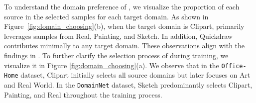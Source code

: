 To understand the domain preference of \ourmethod{}, we visualize the proportion of each source in the selected samples for each target domain. As shown in Figure~\ref{fig:domain_choosing}(b), when the target domain is Clipart, \ourmethod{} primarily leverages samples from Real, Painting, and Sketch. In addition, Quickdraw contributes minimally to any target domain. These observations align with the findings in \cite{peng2019moment_M3SDA}. To further clarify the selection process of \ourmethod{} during training, we visualize it in Figure \ref{fig:domain_choosing}(a). 
We observe that in the \texttt{Office-Home} dataset, Clipart initially selects all source domains but later focuses on Art and Real World. In the \texttt{DomainNet} dataset, Sketch predominantly selects Clipart, Painting, and Real throughout the training process.














